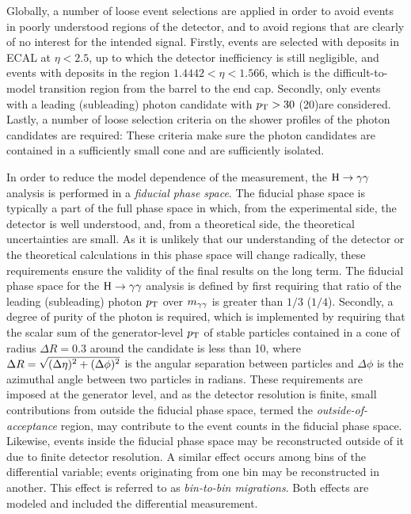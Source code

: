 Globally, a number of loose event selections are applied in order to avoid events in poorly understood regions of the detector, and to avoid regions that are clearly of no interest for the intended signal.
% 
Firstly, events are selected with deposits in ECAL at $\eta<2.5$, up to which the detector inefficiency is still negligible, and events with deposits in the region $1.4442 < \eta < 1.566$, which is the difficult-to-model transition region from the barrel to the end cap.
% 
Secondly, only events with a leading (subleading) photon candidate with $p_\mathrm{T} > 30$ (20)\GeV are considered.
% 
Lastly, a number of loose selection criteria on the shower profiles of the photon candidates are required: These criteria make sure the photon candidates are contained in a sufficiently small cone and are sufficiently isolated.


In order to reduce the model dependence of the measurement, the $\mathrm{H}\to\mathrm{\gamma}\mathrm{\gamma}$ analysis is performed in a \textit{fiducial phase space}.
% 
The fiducial phase space is typically a part of the full phase space in which, from the experimental side, the detector is well understood, and, from a theoretical side, the theoretical uncertainties are small.
% 
As it is unlikely that our understanding of the detector or the theoretical calculations in this phase space will change radically, these requirements ensure the validity of the final results on the long term.
% 
The fiducial phase space for the $\mathrm{H}\to\mathrm{\gamma}\mathrm{\gamma}$ analysis is defined by first requiring that ratio of the leading (subleading) photon $p_\mathrm{T}$ over $m_{\mathrm{\gamma}\mathrm{\gamma}}$ is greater than $1/3$ ($1/4$).
% 
Secondly, a degree of purity of the photon is required, which is implemented by requiring that the scalar sum of the generator-level $p_\mathrm{T}$ of stable particles contained in a cone of radius $\Delta R=0.3$ around the candidate is less than 10\GeV, where $\Delta R = \sqrt{\smash[b]{(\Delta\eta)^2+(\Delta\phi)^2}}$ is the angular separation between particles and $\Delta\phi$ is the azimuthal angle between two particles in radians.
% 
These requirements are imposed at the generator level, and as the detector resolution is finite, small contributions from outside the fiducial phase space, termed the \textit{outside-of-acceptance} region, may contribute to the event counts in the fiducial phase space.
% 
Likewise, events inside the fiducial phase space may be reconstructed outside of it due to finite detector resolution.
% 
A similar effect occurs among bins of the differential variable; events originating from one bin may be reconstructed in another.
% 
This effect is referred to as \textit{bin-to-bin migrations}.
% 
Both effects are modeled and included the differential measurement.


